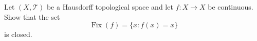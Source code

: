 \documentclass[answers]{exam}
\begin{document}
\begin{questions}



\question%
Let $(X, \mathcal{T})$ be a Hausdorff topological space and let $f: X \to X$ be continuous. Show that the set \[
	\operatorname{Fix}(f)=\{x: f(x)=x\}
\] is closed.

\end{questions}
\end{document}
